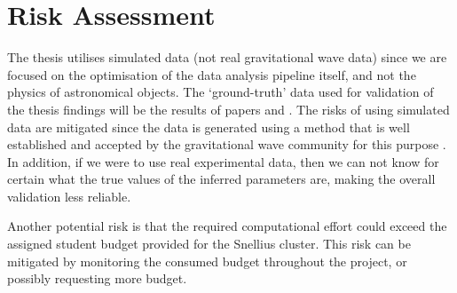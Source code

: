 \section{Risk Assessment}
\label{sec:risk_assessment}

The thesis utilises simulated data (not real gravitational wave data) since we are focused on the optimisation of the data analysis pipeline itself, and not the physics of astronomical objects. The `ground-truth' data used for validation of the thesis findings will be the results of papers \cite{bhardwaj2023peregrine} and \cite{alvey2023things}. The risks of using simulated data are mitigated since the data is generated using a method that is well established and accepted by the gravitational wave community for this purpose \cite{alvey2023things}. In addition, if we were to use real experimental data, then we can not know for certain what the true values of the inferred parameters are, making the overall validation less reliable.

Another potential risk is that the required computational effort could exceed the assigned student budget provided for the Snellius cluster. This risk can be mitigated by monitoring the consumed budget throughout the project, or possibly requesting more budget.
